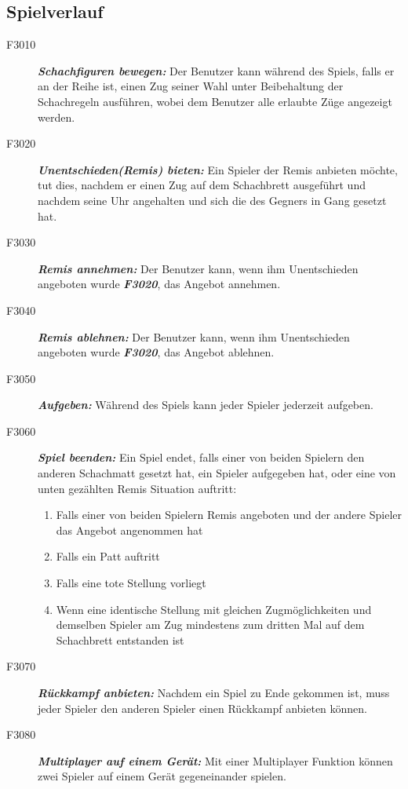 \documentclass[parskip=full]{scrartcl}
\begin{document}
\subsection{Spielverlauf} 
\begin{description}
	\item[F3010]\textbf{\textit{Schachfiguren bewegen: }}Der Benutzer kann während des Spiels, falls er an der Reihe ist, einen Zug seiner Wahl unter Beibehaltung der \gls{Schachregeln} ausführen, wobei dem Benutzer alle erlaubte Züge  angezeigt werden.
	\item[F3020] \textbf{\textit{Unentschieden(Remis) bieten: }} Ein Spieler der Remis anbieten möchte, tut dies, nachdem er einen Zug auf dem Schachbrett ausgeführt und nachdem seine Uhr angehalten und sich die des Gegners in Gang gesetzt hat.
	\item[F3030] \textbf{\textit{Remis annehmen: }} Der Benutzer kann, wenn ihm Unentschieden angeboten wurde \textbf{\textit{F3020}}, das Angebot annehmen.
	
	\item[F3040] \textbf{\textit{Remis ablehnen: }} Der Benutzer kann, wenn ihm Unentschieden angeboten wurde \textbf{\textit{F3020}}, das Angebot ablehnen.
	
	\item[F3050] \textbf{\textit{Aufgeben: }} Während des Spiels kann jeder Spieler jederzeit aufgeben.
	\item[F3060] \textbf{\textit{Spiel beenden: }} Ein Spiel endet, falls einer von beiden Spielern den anderen Schachmatt gesetzt hat, ein Spieler aufgegeben hat, oder eine von unten gezählten Remis Situation auftritt:
	\begin{enumerate}	    
		\item Falls einer von beiden Spielern Remis angeboten und der andere Spieler das Angebot angenommen hat
		\item Falls ein \gls{Patt} auftritt
		\item Falls eine \gls{tote Stellung} vorliegt
		\item Wenn eine identische Stellung mit gleichen Zugmöglichkeiten und demselben Spieler am Zug mindestens zum dritten Mal auf dem Schachbrett entstanden ist 
	\end{enumerate}
	\item[F3070] \textbf{\textit{Rückkampf anbieten: }} Nachdem ein Spiel zu Ende gekommen ist, muss jeder Spieler den anderen Spieler einen Rückkampf anbieten können.		
	\item[F3080] \textbf{\textit{Multiplayer auf einem Gerät: }}  Mit einer Multiplayer Funktion können zwei Spieler auf einem Gerät gegeneinander spielen.
\end{description}
\newpage
\end{document}
